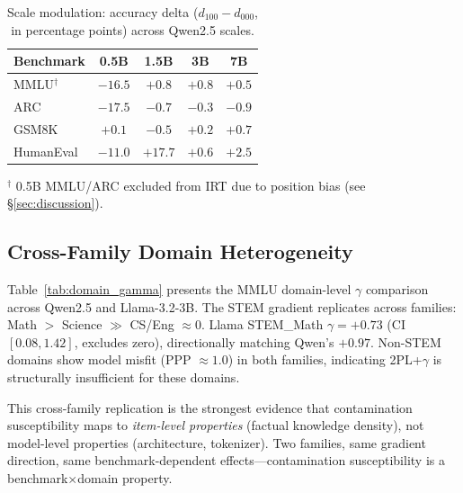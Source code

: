 \documentclass[11pt,a4paper]{article}
\begin{document}
\begin{table}[t]
\centering
\small
\caption{Scale modulation: accuracy delta ($d_{100} - d_{000}$, in percentage points) across Qwen2.5 scales.}
\label{tab:scale_modulation}
\begin{tabular}{lcccc}
\toprule
\textbf{Benchmark} & \textbf{0.5B} & \textbf{1.5B} & \textbf{3B} & \textbf{7B} \\
\midrule
MMLU$^\dagger$ & $-16.5$ & $+0.8$ & $+0.8$ & $+0.5$ \\
ARC & $-17.5$ & $-0.7$ & $-0.3$ & $-0.9$ \\
GSM8K & $+0.1$ & $-0.5$ & $+0.2$ & $+0.7$ \\
HumanEval & $-11.0$ & $+17.7$ & $+0.6$ & $+2.5$ \\
\bottomrule
\end{tabular}
\begin{flushleft}
\footnotesize{$^\dagger$ 0.5B MMLU/ARC excluded from IRT due to position bias (see \S\ref{sec:discussion}).}
\end{flushleft}
\end{table}

\subsection{Cross-Family Domain Heterogeneity}
\label{sec:cross_family}

Table~\ref{tab:domain_gamma} presents the MMLU domain-level $\gamma$ comparison across Qwen2.5 and Llama-3.2-3B. The STEM gradient replicates across families: Math $>$ Science $\gg$ CS/Eng $\approx 0$. Llama STEM\_Math $\gamma = +0.73$ (CI $[0.08, 1.42]$, excludes zero), directionally matching Qwen's $+0.97$. Non-STEM domains show model misfit (PPP $\approx 1.0$) in both families, indicating 2PL+$\gamma$ is structurally insufficient for these domains.

This cross-family replication is the strongest evidence that contamination susceptibility maps to \emph{item-level properties} (factual knowledge density), not model-level properties (architecture, tokenizer). Two families, same gradient direction, same benchmark-dependent effects---contamination susceptibility is a benchmark$\times$domain property.
\end{document}

